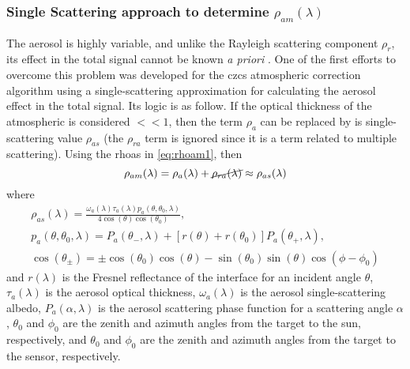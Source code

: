 \subsubsection{Single Scattering approach to determine $\rho_{am}(\lambda)$}
\label{subsubsec:singlescat}
The aerosol is highly variable, and unlike the Rayleigh scattering component $\rho_r$, its effect in the total signal cannot be known {\it a priori} \cite{Gordon:1994}. One of the first efforts to overcome this problem was developed for the \gls{czcs} atmospheric correction algorithm using a single-scattering approximation for calculating the aerosol effect in the total signal. Its logic is as follow. If the optical thickness of the atmospheric is considered $<<1$, then the term $\rho_a$ can be replaced by is single-scattering value $\rho_{as}$ (the $\rho_{ra}$ term is ignored since it is a term related to multiple scattering). Using the \gls{rhoas} in \autoref{eq:rhoam1}, then
\begin{equation}\label{eq:singleapprox}
  \rho_{am}(\lambda) = \rho_a(\lambda)+\cancel{\rho_{ra}(\lambda)} \approx \rho_{as}(\lambda)
\end{equation}
where
\begin{equation}\label{eq:rhoas}
  \begin{gathered}
    \rho_{as}(\lambda) = \frac{\omega_a(\lambda)\tau_a(\lambda)p_a(\theta,\theta_0,\lambda)}{4\cos(\theta)\cos(\theta_0)},\\  
    p_a(\theta,\theta_0,\lambda) = P_a(\theta_{-},\lambda) + [r(\theta)+r(\theta_0)]P_a(\theta_{+},\lambda),\\
    \cos(\theta_{\pm}) = \pm \cos(\theta_0)\cos(\theta)-\sin(\theta_0)\sin(\theta)\cos(\phi-\phi_0)
  \end{gathered}
\end{equation}
and $r(\lambda)$ is the Fresnel reflectance of the interface for an incident angle $\theta$, $\tau_a(\lambda)$ is the aerosol optical thickness, $\omega_a(\lambda)$ is the aerosol single-scattering albedo, $P_a(\alpha,\lambda)$ is the aerosol scattering phase function for a scattering angle $\alpha$, $\theta_0$ and $\phi_0$ are the zenith and azimuth angles from the target to the sun, respectively, and $\theta_0$ and $\phi_0$ are the zenith and azimuth angles from the target to the sensor, respectively. 


